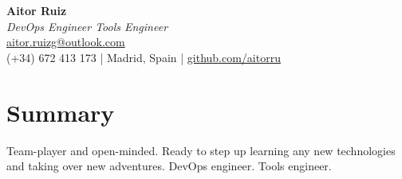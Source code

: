 \begin{center}
    {\LARGE \textbf{Aitor Ruiz}}\\[1ex]
    \textit{DevOps Engineer \textbullet{} Tools Engineer}\\
    \href{mailto:aitor.ruizg@outlook.com}{aitor.ruizg@outlook.com}\\
    (+34) 672 413 173 | Madrid, Spain | \href{https://github.com/aitorru}{github.com/aitorru} \\
\end{center}

\section*{Summary}
Team-player and open-minded. Ready to step up learning any new technologies and taking over new adventures. DevOps engineer. Tools engineer.

